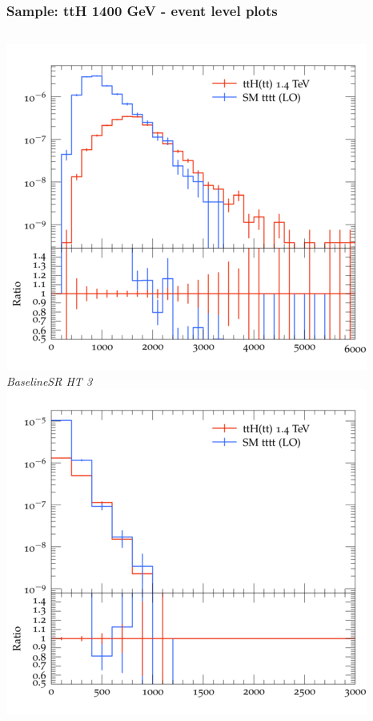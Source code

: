 \documentclass{beamer}
\begin{document}
\begin{frame}
\frametitle{Sample: ttH 1400 GeV - event level plots}
\begin{columns}
\includegraphics[width=\textwidth]{../plots/ttH_1400/tttt_ttH_1LOS/BaselineSR_HT_3.png}\\
\textit{\small BaselineSR HT 3}
\includegraphics[width=\textwidth]{../plots/ttH_1400/tttt_ttH_1LOS/BaselineSR_MET.png}\\

\end{columns}
\end{frame}
\end{document}
